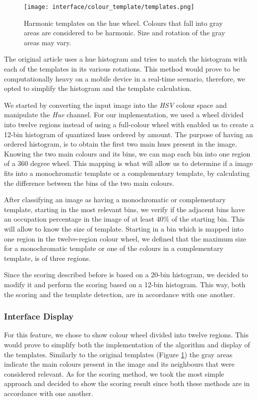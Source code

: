 \begin{figure}[htb]
	\centering
	\texttt{[image: interface/colour\_template/templates.png]}
  	\caption{Harmonic templates on the hue wheel. Colours that fall into gray areas are considered to be harmonic. Size and rotation of the gray areas may vary.}
	\label{fig:templates}
\end{figure}

The original article uses a hue histogram and tries to match the histogram with each of the templates in its various rotations. This method would prove to be computationally heavy on a mobile device in a real-time scenario, therefore, we opted to simplify the histogram and the template calculation. 

We started by converting the input image into the \emph{HSV} colour space and manipulate the \emph{Hue} channel. For our implementation, we used a wheel divided into twelve regions instead of using a full-colour wheel with enabled us to create a 12-bin histogram of quantized hues ordered by amount. The purpose of having an ordered histogram, is to obtain the first two main hues present in the image. Knowing the two main colours and its bins, we can map each bin into one region of a 360 degree wheel. This mapping is what will allow us to determine if a image fits into a monochromatic template or a complementary template, by calculating the difference between the bins of the two main colours.

After classifying an image as having a monochromatic or complementary template, starting in the most relevant bins, we verify if the adjacent bins have an occupation percentage in the image of at least 40\% of the starting bin. This will allow to know the size of template. Starting in a bin which is mapped into one region in the twelve-region colour wheel, we defined that the maximum size for a monochromatic template or one of the colours in a complementary template, is of three regions.

Since the scoring described before is based on a 20-bin histogram, we decided to modify it and perform the scoring based on a 12-bin histogram. This way, both the scoring and the template detection, are in accordance with one another.

\subsubsection{Interface Display}

For this feature, we chose to show colour wheel divided into twelve regions. This would prove to simplify both the implementation of the algorithm and display of the templates. Similarly to the original templates (Figure \ref{fig:templates}) the gray areas indicate the main colours present in the image and its neighbours that were considered relevant.
As for the scoring method, we took the most simple approach and decided to show the scoring result since both these methods are in accordance with one another.

